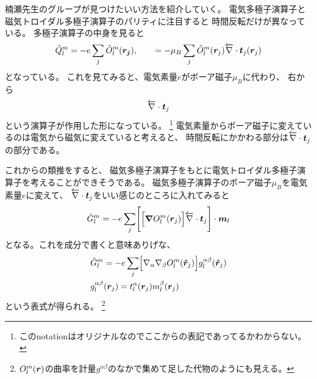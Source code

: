 \documentclass[../../master.tex]{subfiles}
\begin{document}
楠瀬先生のグループが見つけたいい方法を紹介していく。
電気多極子演算子と磁気トロイダル多極子演算子のパリティに注目すると
時間反転だけが異なっている。
多極子演算子の中身を見ると
\begin{equation}
    \hat{Q}_l^m= -e \sum_{j} \hat{O}_l^m(\vb*{r_j}), \qquad
    = -\mu_B \sum_j   \hat{O}_l^m(\vb*{r}_j)  \overleftarrow{\nabla} \cdot \vb*{t}_j(\vb*{r}_j)
\end{equation}
となっている。
これを見てみると、電気素量\(e\)がボーア磁子\(\mu_B\)に代わり、
右から
\begin{equation}
    \overleftarrow{\nabla} \cdot \vb*{t}_j
\end{equation}
という演算子が作用した形になっている。
\footnote{このnotationはオリジナルなのでここからの表記であってるかわからない。}
電気素量からボーア磁子に変えているのは電気から磁気に変えていると考えると、
時間反転にかかわる部分は\(\overleftarrow{\nabla} \cdot \vb*{t}_j\)の部分である。

これからの類推をすると、
磁気多極子演算子をもとに電気トロイダル多極子演算子を考えることができそうである。
磁気多極子演算子のボーア磁子\(\mu_B\)を電気素量\(e\)に変えて、
\(\overleftarrow{\nabla} \cdot \vb*{t}_j\)をいい感じのところに入れてみると
\begin{equation}
    \hat{G}_l^m = -e\sum_j\Biggl[\Bigl[\grad O_l^m(\vb*{r}_j)\Bigr] \overleftarrow{\nabla} \cdot \vb*{t}_j \Biggr]\cdot\vb*{m}_l
\end{equation}
となる。これを成分で書くと意味ありげな、
\begin{align}
    &\hat{G}_l^m = -e\sum_j\Bigl[\nabla_\alpha\nabla_\beta O_l^m(\vb*{\hat{r}}_j)\Bigr] g_l^{\alpha \beta}(\vb*{\hat{r}}_j)\\
    &g_l^{\alpha \beta}(\vb*{r}_j) = t_l^\alpha(\vb*{r}_j)m_l^\beta(\vb*{r}_j)
\end{align}
という表式が得られる。
\footnote{\(O_l^m(\vb*{r})\)の曲率を計量\(g^{\alpha\beta}\)のなかで集めて足した代物のようにも見える。}
\end{document}
